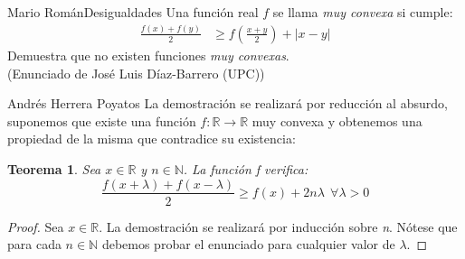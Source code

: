 \documentclass[a4paper, 11pt]{article} %
\newtheorem{theorem}{Teorema}
\numberwithin{prbcounter}{section}
\begin{document}
  
  \begin{enunciado}{Mario Román}{Desigualdades}
    Una función real $f$ se llama \textit{muy convexa} si cumple:
    \begin{align*}
      \frac{f(x)+f(y)}{2} & \geq  f\left(\frac{x+y}{2}\right) + |x - y|
    \end{align*}
    Demuestra que no existen funciones \textit{muy convexas}. \\
    (Enunciado de José Luis Díaz-Barrero (UPC))
  \end{enunciado}
  \begin{solucion}{Andrés Herrera Poyatos}
  	La demostración se realizará por reducción al absurdo, suponemos que existe 
  	una función $f: \mathbb{R} \rightarrow \mathbb{R}$ muy convexa y obtenemos
  	una propiedad de la misma que contradice su existencia:
  	\begin{theorem}
  	    Sea $x \in \mathbb{R}$ y $n \in \mathbb{N}$. La función \textit{f} verifica:
  	    \begin{equation*}
  	        \frac{f(x+\lambda)+f(x-\lambda)}{2} \ge f(x) + 2n \lambda \ \ \forall \lambda > 0
  	    \end{equation*}
  	\end{theorem} 
  	\begin{proof}
  	    Sea $x \in \mathbb{R}$. La demostración se realizará por inducción sobre \textit{n}. 
  	    Nótese que para cada $n\in\mathbb{N}$ debemos probar el enunciado para cualquier valor 
  	    de $\lambda$.
  	    

\end{proof}
\end{solucion}
\end{document}
